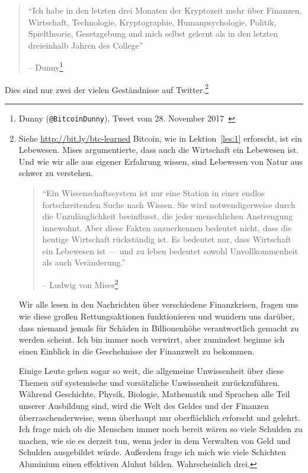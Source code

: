 \begin{quotation}\begin{samepage}
\enquote{Ich habe in den letzten drei Monaten der Kryptozeit mehr über Finanzen,
Wirtschaft, Technologie, Kryptographie, Humanpsychologie, Politik, Spieltheorie,
Gesetzgebung und mich selbst gelernt als in den letzten dreieinhalb Jahren des
College}
\begin{flushright} -- Dunny\footnote{Dunny (\texttt{@BitcoinDunny}), Tweet vom 28. November 2017~\cite{bitcoindunny-tweet}}
\end{flushright}\end{samepage}\end{quotation}

Dies sind nur zwei der vielen Geständnisse auf Twitter.\footnote{Siehe
\url{http://bit.ly/btc-learned} Bitcoin, wie in Lektion~\ref{les:1} erforscht,
ist ein Lebewesen. Mises argumentierte, dass auch die Wirtschaft ein Lebewesen
ist. Und wie wir alle aus eigener Erfahrung wissen, sind Lebewesen von Natur aus
schwer zu verstehen.

\begin{quotation}\begin{samepage}
\enquote{Ein Wissenschaftssystem ist nur eine Station in einer endlos
fortschreitenden Suche nach Wissen. Sie wird notwendigerweise durch die
Unzulänglichkeit beeinflusst, die jeder menschlichen Anstrengung innewohnt. Aber
diese Fakten anzuerkennen bedeutet nicht, dass die heutige Wirtschaft
rückständig ist. Es bedeutet nur, dass Wirtschaft ein Lebewesen ist — und zu
leben bedeutet sowohl Unvollkommenheit als auch Veränderung.}
\begin{flushright} -- Ludwig von Mises\footnote{Ludwig von Mises, \textit{Human Action}
\cite{human-action}}
\end{flushright}\end{samepage}\end{quotation}

\newpage

Wir alle lesen in den Nachrichten über verschiedene Finanzkrisen, fragen uns wie
diese großen Rettungsaktionen funktionieren und wundern uns darüber, dass
niemand jemals für Schäden in Billionenhöhe verantwortlich gemacht zu werden
scheint. Ich bin immer noch verwirrt, aber zumindest beginne ich einen Einblick
in die Geschehnisse der Finanzwelt zu bekommen.

Einige Leute gehen sogar so weit, die allgemeine Unwissenheit über diese Themen
auf systemische und vorsätzliche Unwissenheit zurückzuführen. Während
Geschichte, Physik, Biologie, Mathematik und Sprachen alle Teil unserer
Ausbildung sind, wird die Welt des Geldes und der Finanzen überraschenderweise,
wenn überhaupt nur oberflächlich erforscht und gelehrt. Ich frage mich ob die
Menschen immer noch bereit wären so viele Schulden zu machen, wie sie es derzeit
tun, wenn jeder in dem Verwalten von Geld und Schulden ausgebildet würde.
Außerdem frage ich mich wie viele Schichten Aluminium einen effektiven Aluhut
bilden. Wahrscheinlich drei.

}
